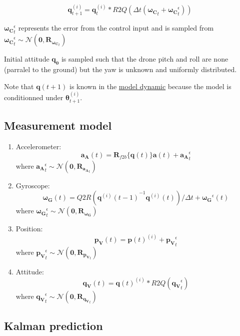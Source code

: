 \documentclass[]{article}
\providecommand{\tightlist}{%
  \setlength{\itemsep}{0pt}\setlength{\parskip}{0pt}}
\begin{document}
\[\mathbf{q}^{(i)}_{t+1} = \mathbf{q}^{(i)}_t*R2Q({\Delta t} (\mathbf{\boldsymbol{\omega}_C}_t+\mathbf{\boldsymbol{\omega}_C}^\epsilon_t))\]

\(\mathbf{\boldsymbol{\omega}_C}^\epsilon_t\) represents the error from
the control input and is sampled from
\(\mathbf{\boldsymbol{\omega}_C}^\epsilon_t \sim \mathcal{N}(\mathbf{0}, \mathbf{R}_{\mathbf{\boldsymbol{\omega}_C}_t })\)

Initial attitude \(\mathbf{q_0}\) is sampled such that the drone pitch
and roll are none (parralel to the ground) but the yaw is unknown and
uniformly distributed.

Note that \(\mathbf{q}(t+1)\) is known in the
\protect\hyperlink{model-dynamic}{model dynamic} because the model is
conditionned under \(\boldsymbol{\theta}^{(i)}_{t+1}\).

\subsection{Measurement model}\label{measurement-model}

\begin{enumerate}
\def\labelenumi{\arabic{enumi}.}
\tightlist
\item
  Accelerometer:
  \[\mathbf{a_A}(t) = \mathbf{R}_{f2b}\{\mathbf{q}(t)\}\mathbf{a}(t) + \mathbf{a_A}^\epsilon_t\]
  where
  \(\mathbf{a_A}^\epsilon_t \sim \mathcal{N}(\mathbf{0}, \mathbf{R}_{\mathbf{a_A}_t })\)
\item
  Gyroscope:
  \[\mathbf{\boldsymbol{\omega}_G}(t) = Q2R({\mathbf{q}^{(i)}(t-1)}^{-1}\mathbf{q}^{(i)}(t))/\Delta t + \mathbf{\boldsymbol{\omega}_G}^\epsilon(t)\]
  where
  \(\mathbf{\boldsymbol{\omega}_G}^\epsilon_t \sim \mathcal{N}(\mathbf{0}, \mathbf{R}_{\mathbf{\boldsymbol{\omega}_G}})\)
\item
  Position:
  \[\mathbf{p_V}(t) = \mathbf{p}(t)^{(i)} + \mathbf{p_V}^\epsilon_t\]
  where
  \(\mathbf{p_V}^\epsilon_t \sim \mathcal{N}(\mathbf{0}, \mathbf{R}_{\mathbf{p_V}_t })\)
\item
  Attitude:
  \[\mathbf{q_V}(t) = \mathbf{q}(t)^{(i)}*R2Q(\mathbf{q_V}^\epsilon_t)\]
  where
  \(\mathbf{q_V}^\epsilon_t \sim \mathcal{N}(\mathbf{0}, \mathbf{R}_{\mathbf{q_V}_t })\)
\end{enumerate}

\subsection{Kalman prediction}\label{kalman-prediction}
\end{document}
